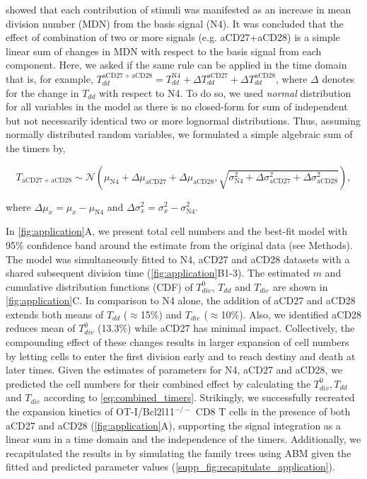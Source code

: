 \documentclass[11pt, a4paper]{article}
\begin{document}
\cite{Marchingo.2014} showed that each contribution of stimuli was manifested as an increase in mean division number (MDN) from the basis signal (N4). It was concluded that the effect of combination of two or more signals (e.g. aCD27+aCD28) is a simple linear sum of changes in MDN with respect to the basis signal from each component. Here, we asked if the same rule can be applied in the time domain that is, for example, $T_{dd}^{\mathrm{aCD27+aCD28}} = T_{dd}^{\mathrm{N4}} + \Delta T_{dd}^{\mathrm{aCD27}} + \Delta T_{dd}^{\mathrm{aCD28}}$, where $\Delta$ denotes for the change in $T_{dd}$ with respect to N4. To do so, we used \textit{normal} distribution for all variables in the model as there is no closed-form for sum of independent but not necessarily identical two or more lognormal distributions. Thus, assuming normally distributed random variables, we formulated a simple algebraic sum of the timers by,
\begin{linenomath*}
    \begin{equation}
        \label{eq:combined_timers}
        T_{\mathrm{aCD27+aCD28}} \sim \mathcal{N}\left(\mu_{\mathrm{N4}} + \Delta \mu_{\mathrm{aCD27}} + \Delta \mu_{\mathrm{aCD28}}, \sqrt{\sigma_{\mathrm{N4}}^2 + \Delta \sigma^2_{\mathrm{aCD27}} + \Delta \sigma^2_{\mathrm{aCD28}}}\right),
    \end{equation}
\end{linenomath*}
where $\Delta \mu_x = \mu_x - \mu_{\mathrm{N4}}$ and $\Delta \sigma_x^2 = \sigma_x^2 - \sigma_{\mathrm{N4}}^2$.

In \cref{fig:application}A, we present total cell numbers and the best-fit model with 95\% confidence band around the estimate from the original data (see Methods). The model was simultaneously fitted to N4, aCD27 and aCD28 datasets with a shared subsequent division time (\cref{fig:application}B1-3). The estimated $m$ and cumulative distribution functions (CDF) of $T_{div}^0$, $T_{dd}$ and $T_{die}$ are shown in \cref{fig:application}C. In comparison to N4 alone, the addition of aCD27 and aCD28 extends both means of $T_{dd}$ ($\approx$15\%) and $T_{die}$ ($\approx$10\%). Also, we identified aCD28 reduces mean of $T_{div}^0$ (13.3\%) while aCD27 has minimal impact. Collectively, the compounding effect of these changes results in larger expansion of cell numbers by letting cells to enter the first division early and to reach destiny and death at later times. Given the estimates of parameters for N4, aCD27 and aCD28, we predicted the cell numbers for their combined effect by calculating the $T_{div}^0, T_{dd}$ and $T_{die}$ according to \cref{eq:combined_timers}. Strikingly, we successfully recreated the expansion kinetics of OT-I/Bcl2l11$^{-/-}$ CD8 T cells in the presence of both aCD27 and aCD28 (\cref{fig:application}A), supporting the signal integration as a linear sum in a time domain and the independence of the timers. Additionally, we recapitulated the results in \cite{Marchingo.2014} by simulating the family trees using ABM given the fitted and predicted parameter values (\cref{supp_fig:recapitulate_application}). 
\end{document}
